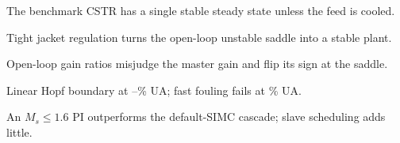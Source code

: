 \begin{highlights}
\item The benchmark CSTR has a single stable steady state unless the feed is cooled.
\item Tight jacket regulation turns the open-loop unstable saddle into a stable plant.
\item Open-loop gain ratios misjudge the master gain and flip its sign at the saddle.
\item Linear Hopf boundary at \fstabCascade--\fstabSiso\% UA; fast fouling fails at \uaRunPctSadSiso\% UA.
\item An $M_s\le1.6$ PI outperforms the default-SIMC cascade; slave scheduling adds little.
\end{highlights}
